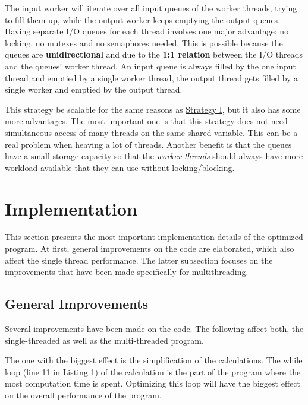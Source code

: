 The input worker will iterate over all input queues of the worker threads, trying to fill them up, while the output worker keeps emptying the output queues. Having separate I/O queues for each thread involves one major advantage: no locking, no mutexes and no semaphores needed. This is possible because the queues are \textbf{unidirectional} and due to the \textbf{1:1 relation} between the I/O threads and the queues' worker thread. An input queue is always filled by the one input thread and emptied by a single worker thread, the output thread gets filled by a single worker and emptied by the output thread.

This strategy be scalable for the same reasons as \hyperref[ssec:strategy-i]{Strategy I}, but it also has some more advantages. The most important one is that this strategy does not need simultaneous access of many threads on the same shared variable. This can be a real problem when heaving a lot of threads. Another benefit is that the queues have a small storage capacity so that the \textit{worker threads} should always have more workload available that they can use without locking/blocking.

\section{Implementation}
\label{sec:implementation}

This section presents the most important implementation details of the optimized program. At first, general improvements on the code are elaborated, which also affect the single thread performance. The latter subsection focuses on the improvements that have been made specifically for multithreading.

\subsection{General Improvements}
\label{ssec:general-improvements}

Several improvements have been made on the code. The following affect both, the single-threaded as well as the multi-threaded program.

The one with the biggest effect is the simplification of the calculations. The while loop (line 11 in \hyperref[lst:pseudo-code-original]{Listing 1}) of the \ms{} calculation is the part of the program where the most computation time is spent. Optimizing this loop will have the biggest effect on the overall performance of the program.

